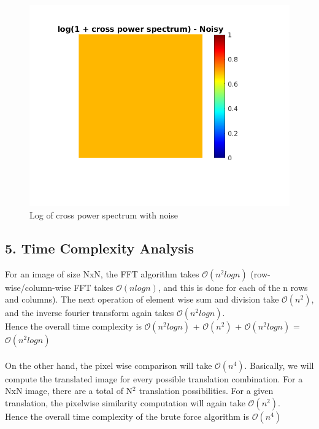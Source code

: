 \documentclass[12pt, a4paper]{article}
\begin{document}
\begin{figure}[h!]
\begin{minipage}[c][1\width]{0.6\textwidth}
    	\includegraphics[width=1\textwidth]{log_fft_noisy.png}
    	\vspace*{-60pt}
    	\caption{Log of cross power spectrum with noise}
	    \label{fig:5.3.b}
    \end{minipage}
\end{figure}
\newpage
\subsection*{5. Time Complexity Analysis}
For an image of size NxN, the FFT algorithm takes $\mathcal{O}(n^2logn)$ (row-wise/column-wise FFT takes $\mathcal{O}(nlogn)$, and this is done for each of the n rows and columns). The next operation of element wise sum and division take $\mathcal{O}(n^2)$, and the inverse fourier transform again takes $\mathcal{O}(n^2logn)$. \\
Hence the overall time complexity is $\mathcal{O}(n^2logn)$ + $\mathcal{O}(n^2)$ + $\mathcal{O}(n^2logn)$ = $\mathcal{O}(n^2logn)$ \\ \\ 
On the other hand, the pixel wise comparison will take $\mathcal{O}(n^4)$. Basically, we will compute the translated image for every possible translation combination. For a NxN image, there are a total of N$^2$ translation possibilities. For a given translation, the pixelwise similarity computation will again take $\mathcal{O}(n^2)$. \\ Hence the overall time complexity of the brute force algorithm is $\mathcal{O}(n^4)$
\end{document}
